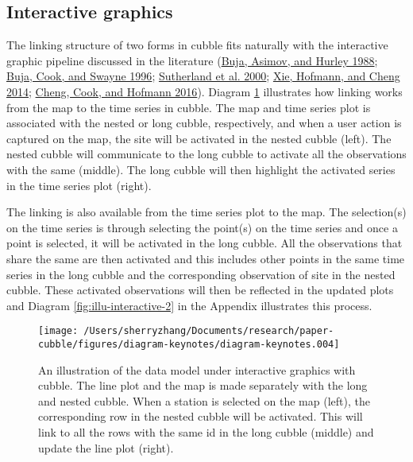 \documentclass{article}
\begin{document}
\hypertarget{interactive-graphics}{%
\subsection{Interactive graphics}\label{interactive-graphics}}

The linking structure of two forms in cubble fits naturally with the interactive graphic pipeline discussed in the literature (\protect\hyperlink{ref-buja1988elements}{Buja, Asimov, and Hurley 1988}; \protect\hyperlink{ref-buja1996interactive}{Buja, Cook, and Swayne 1996}; \protect\hyperlink{ref-sutherland2000orca}{Sutherland et al. 2000}; \protect\hyperlink{ref-xie2014reactive}{Xie, Hofmann, and Cheng 2014}; \protect\hyperlink{ref-cheng2016enabling}{Cheng, Cook, and Hofmann 2016}). Diagram \ref{fig:illu-interactive} illustrates how linking works from the map to the time series in cubble. The map and time series plot is associated with the nested or long cubble, respectively, and when a user action is captured on the map, the site will be activated in the nested cubble (left). The nested cubble will communicate to the long cubble to activate all the observations with the same  (middle). The long cubble will then highlight the activated series in the time series plot (right).

The linking is also available from the time series plot to the map. The selection(s) on the time series is through selecting the point(s) on the time series and once a point is selected, it will be activated in the long cubble. All the observations that share the same  are then activated and this includes other points in the same time series in the long cubble and the corresponding observation of site in the nested cubble. These activated observations will then be reflected in the updated plots and Diagram \ref{fig:illu-interactive-2} in the Appendix illustrates this process.

\begin{figure}

{\centering \texttt{[image: /Users/sherryzhang/Documents/research/paper-cubble/figures/diagram-keynotes/diagram-keynotes.004]} 

}

\caption{An illustration of the data model under interactive graphics with cubble. The line plot and the map is made separately with the long and nested cubble. When a station is selected on the map (left), the corresponding row in the nested cubble will be activated. This will link to all the rows with the same id in the long cubble (middle) and update the line plot (right).}\label{fig:illu-interactive}
\end{figure}
\end{document}
